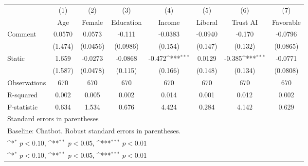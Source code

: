 {
\def\sym#1{\ifmmode^{#1}\else\(^{#1}\)\fi}
\begin{tabular}{l*{7}{c}}
\toprule
                    &\multicolumn{1}{c}{(1)}&\multicolumn{1}{c}{(2)}&\multicolumn{1}{c}{(3)}&\multicolumn{1}{c}{(4)}&\multicolumn{1}{c}{(5)}&\multicolumn{1}{c}{(6)}&\multicolumn{1}{c}{(7)}\\
                    &\multicolumn{1}{c}{Age}&\multicolumn{1}{c}{Female}&\multicolumn{1}{c}{Education}&\multicolumn{1}{c}{Income}&\multicolumn{1}{c}{Liberal}&\multicolumn{1}{c}{Trust AI}&\multicolumn{1}{c}{Favorable}\\
\midrule
Comment             &      0.0570         &      0.0573         &      -0.111         &     -0.0383         &     -0.0940         &      -0.170         &     -0.0796         \\
                    &     (1.474)         &    (0.0456)         &    (0.0986)         &     (0.154)         &     (0.147)         &     (0.132)         &    (0.0865)         \\
\addlinespace
Static              &       1.659         &     -0.0273         &     -0.0868         &      -0.472\sym{***}&      0.0129         &      -0.385\sym{***}&     -0.0771         \\
                    &     (1.587)         &    (0.0478)         &     (0.115)         &     (0.166)         &     (0.148)         &     (0.134)         &    (0.0808)         \\
\midrule
Observations        &         670         &         670         &         670         &         670         &         670         &         670         &         670         \\
R-squared           &       0.002         &       0.005         &       0.002         &       0.014         &       0.001         &       0.012         &       0.002         \\
F-statistic         &       0.634         &       1.534         &       0.676         &       4.424         &       0.284         &       4.142         &       0.629         \\
\bottomrule
\multicolumn{8}{l}{\footnotesize Standard errors in parentheses}\\
\multicolumn{8}{l}{\footnotesize Baseline: Chatbot. Robust standard errors in parentheses.}\\
\multicolumn{8}{l}{\footnotesize \sym{*} \(p<0.10\), \sym{**} \(p<0.05\), \sym{***} \(p<0.01\)}\\
\multicolumn{8}{l}{\footnotesize \sym{*} \(p<0.10\), \sym{**} \(p<0.05\), \sym{***} \(p<0.01\)}\\
\end{tabular}
}
